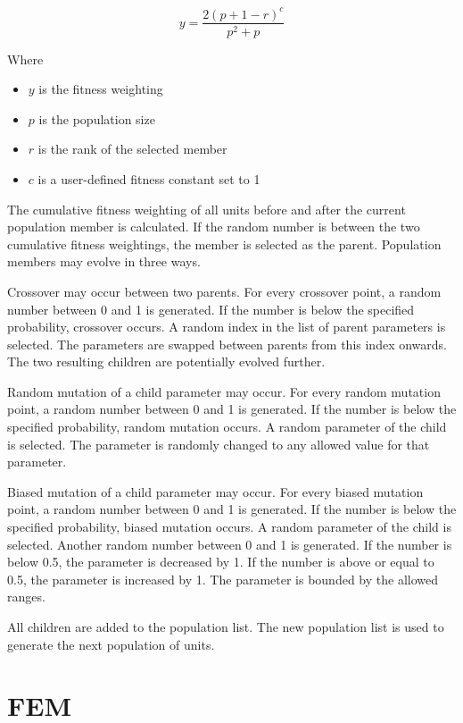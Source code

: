 \begin{equation}
	y=\frac{2\left ( p+1-r \right )^{c}}{p^{2}+p}
\end{equation}

Where

\begin{itemize}
	\item $y$ is the fitness weighting
	\item $p$ is the population size
	\item $r$ is the rank of the selected member
	\item $c$ is a user-defined fitness constant set to 1
\end{itemize}

The cumulative fitness weighting of all units before and after the current population member is calculated. If the random number is between the two cumulative fitness weightings, the member is selected as the parent. Population members may evolve in three ways.

Crossover may occur between two parents. For every crossover point, a random number between 0 and 1 is generated. If the number is below the specified probability, crossover occurs. A random index in the list of parent parameters is selected. The parameters are swapped between parents from this index onwards. The two resulting children are potentially evolved further.

Random mutation of a child parameter may occur. For every random mutation point, a random number between 0 and 1 is generated. If the number is below the specified probability, random mutation occurs. A random parameter of the child is selected. The parameter is randomly changed to any allowed value for that parameter.

Biased mutation of a child parameter may occur. For every biased mutation point, a random number between 0 and 1 is generated. If the number is below the specified probability, biased mutation occurs. A random parameter of the child is selected. Another random number between 0 and 1 is generated. If the number is below 0.5, the parameter is decreased by 1. If the number is above or equal to 0.5, the parameter is increased by 1. The parameter is bounded by the allowed ranges.

All children are added to the population list. The new population list is used to generate the next population of units.

\section{FEM}

